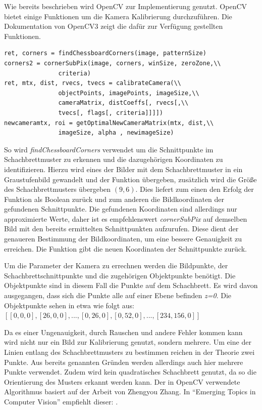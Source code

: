Wie bereits beschrieben wird OpenCV  zur Implementierung genutzt. OpenCV bietet einige Funktionen um die Kamera Kalibrierung durchzuführen. Die Dokumentation von OpenCV3 \autocite{Opencv3Camera2016} zeigt die dafür zur Verfügung gestellten Funktionen. 
\begin{lstlisting}[frame=single]
ret, corners = findChessboardCorners(image, patternSize) 
corners2 = cornerSubPix(image, corners, winSize, zeroZone,\\
               criteria) 
ret, mtx, dist, rvecs, tvecs = calibrateCamera(\\
               objectPoints, imagePoints, imageSize,\\
               cameraMatrix, distCoeffs[, rvecs[,\\
               tvecs[, flags[, criteria]]]]) 
newcameramtx, roi = getOptimalNewCameraMatrix(mtx, dist,\\
               imageSize, alpha , newimageSize)
\end{lstlisting}
So wird \textit{findChessboardCorners} verwendet um die Schnittpunkte im Schachbrettmuster zu erkennen und die dazugehörigen Koordinaten zu identifizieren. Hierzu wird eines der Bilder mit dem Schachbrettmuster in ein Graustufenbild gewandelt und der Funktion übergeben, zusätzlich wird die Größe des Schachbrettmusters übergeben $(9,6)$. Dies liefert zum einen den Erfolg der Funktion als Boolean zurück und zum anderen die Bildkoordinaten der gefundenen Schnittpunkte. 
Die gefundenen Koordinaten sind allerdings nur approximierte Werte, daher ist es empfehlenswert \textit{cornerSubPix} auf demselben Bild mit den bereits ermittelten Schnittpunkten aufzurufen. Diese dient der genaueren Bestimmung der Bildkoordinaten, um eine bessere Genauigkeit zu erreichen. Die Funktion gibt die neuen Koordinaten der Schnittpunkte zurück. 

Um die Parameter der Kamera zu errechnen werden die Bildpunkte, der Schachbrettschnittpunkte und die zugehörigen Objektpunkte benötigt. Die Objektpunkte sind in diesem Fall die Punkte auf dem Schachbrett. Es wird davon ausgegangen, dass sich die Punkte alle auf einer Ebene befinden \textit{z=0}. Die Objektpunkte sehen in etwa wie folgt aus: $[[0,0,0], [26,0,0],...,[0,26,0],[0,52,0],...,[234,156,0]]$

Da es einer Ungenauigkeit, durch Rauschen und andere Fehler kommen kann wird nicht nur ein Bild zur Kalibrierung genutzt, sondern mehrere. Um eine der Linien entlang des Schachbrettmusters zu bestimmen reichen in der Theorie zwei Punkte. Aus bereits genannten Gründen werden allerdings auch hier mehrere Punkte verwendet. Zudem wird kein quadratisches Schachbrett genutzt, da so die Orientierung des Musters erkannt werden kann. 
Der in OpenCV verwendete Algorithmus basiert auf der Arbeit von Zhengyou Zhang. In "`Emerging Topics in Computer Vision"' \autocite{Medioni:2004:ETC:993884} empfiehlt dieser:  \autocite[24]{Zhang2000}.

